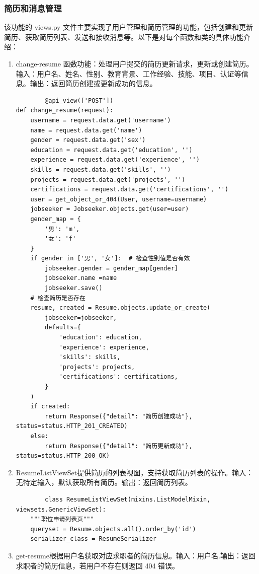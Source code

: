 \documentclass[UTF8,a4paper,10pt]{ctexart}
\begin{document}
\subsubsection{简历和消息管理}
该功能的 views.py 文件主要实现了用户管理和简历管理的功能，包括创建和更新简历、获取简历列表、发送和接收消息等。以下是对每个函数和类的具体功能介绍：
\begin{enumerate}
    \item change-resume 函数功能：处理用户提交的简历更新请求，更新或创建简历。输入：用户名、姓名、性别、教育背景、工作经验、技能、项目、认证等信息。输出：返回简历创建或更新成功的信息。
    \begin{lstlisting}
        @api_view(['POST'])
def change_resume(request):
    username = request.data.get('username')
    name = request.data.get('name')
    gender = request.data.get('sex')
    education = request.data.get('education', '')
    experience = request.data.get('experience', '')
    skills = request.data.get('skills', '')
    projects = request.data.get('projects', '')
    certifications = request.data.get('certifications', '')
    user = get_object_or_404(User, username=username)
    jobseeker = Jobseeker.objects.get(user=user)
    gender_map = {
        '男': 'm',
        '女': 'f'
    }
    if gender in ['男', '女']:  # 检查性别值是否有效
        jobseeker.gender = gender_map[gender]
        jobseeker.name =name
        jobseeker.save()
    # 检查简历是否存在
    resume, created = Resume.objects.update_or_create(
        jobseeker=jobseeker,
        defaults={
            'education': education,
            'experience': experience,
            'skills': skills,
            'projects': projects,
            'certifications': certifications,
        }
    )
    if created:
        return Response({"detail": "简历创建成功"}, status=status.HTTP_201_CREATED)
    else:
        return Response({"detail": "简历更新成功"}, status=status.HTTP_200_OK)
    \end{lstlisting}
    \item ResumeListViewSet提供简历的列表视图，支持获取简历列表的操作。输入：无特定输入，默认获取所有简历。输出：返回简历列表。
    \begin{lstlisting}
        class ResumeListViewSet(mixins.ListModelMixin, viewsets.GenericViewSet):
    """职位申请列表页"""
    queryset = Resume.objects.all().order_by('id')
    serializer_class = ResumeSerializer
    \end{lstlisting}
    \item get-resume根据用户名获取对应求职者的简历信息。输入：用户名.输出：返回求职者的简历信息，若用户不存在则返回 404 错误。

\end{enumerate}
\end{document}
